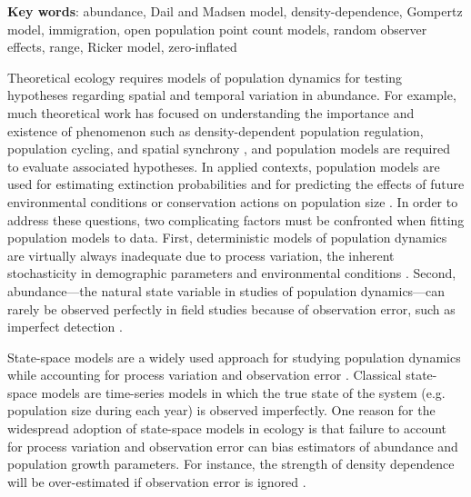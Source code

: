 \documentclass[12pt]{article}
\begin{document}
\vspace{0.5cm}

\textbf{Key words}: abundance, Dail and Madsen model, density-dependence,
Gompertz model, immigration, open population point count models,
random observer effects, range, Ricker model, zero-inflated

\newpage

Theoretical ecology requires models of population dynamics for testing
hypotheses regarding spatial and temporal variation in
abundance. For example, much theoretical work has focused on
understanding the importance and existence of phenomenon such as
density-dependent population regulation, population cycling, and spatial synchrony
\citep{may:1975,royama:1977,turchin:1990,dennis_taper:1994,bjornstad_etal:1999},
and population models are required to evaluate associated hypotheses.
In applied contexts, population models are used for
estimating extinction probabilities
\citep{schoener_spiller:1992,nadeem_lele:2011} and for predicting the
effects of future environmental conditions or conservation actions on
population size \citep{jamieson_brooks:2004,hatfield_etal:2012}.
In order to address these questions, two complicating factors must
be confronted when fitting population models to data.
First, deterministic models of population
dynamics are virtually always inadequate due to process variation,
the inherent stochasticity in demographic parameters and environmental
conditions \citep{bjornstad_grenfell:2001,saether_engen:2002}.
Second, abundance---the natural state variable in studies
of population dynamics---can rarely be observed perfectly in field
studies because of observation error, such as imperfect
detection \citep{link_nichols:1994,kery_etal:2009}.

State-space models are a widely used approach for
studying population dynamics while accounting for process variation
and observation error \citep{devalpine_hastings:2002,
  buckland_etal:2004, dennis_etal:2006}. Classical state-space
models are time-series models in which the true state of the
system (e.g. population size during each year) is observed
imperfectly. One reason for the widespread adoption of state-space
models in ecology is that failure to account for process variation and
observation error can bias estimators of abundance and population
growth parameters. For instance, the strength of
density dependence will be over-estimated if observation error is
ignored \citep{link_nichols:1994,shenk_etal:1998}.
\end{document}
